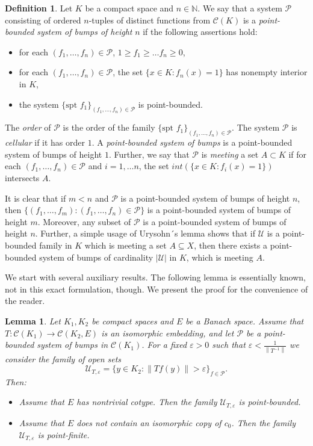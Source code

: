 \documentclass{amsart}
\numberwithin{equation}{section}
\newtheorem{lemma}[thm]{Lemma}
\theoremstyle{definition}
\newtheorem{definition}[thm]{Definition}
\def\C{\mathcal C}
\def\ep{\varepsilon}
\def\en{\mathbb N}
\newcommand{\norm}[1]{\left\|#1\right\|}
\newcommand{\abs}[1]{\left| #1  \right|}
\begin{document}
\begin{definition}
Let $K$ be a compact space and $n \in \en$. We say that a system $\mathcal{P}$ consisting of ordered $n$-tuples of distinct functions from $\C(K)$ is a \emph{point-bounded system of bumps of height} $n$ if  the following assertions hold:
\begin{itemize}
    \item for each $(f_1, \ldots, f_{n})  \in \mathcal{P}$, $1 \geq f_1 \geq \ldots f_{n} \geq 0$, 
    \item for each $(f_1, \ldots, f_{n})  \in \mathcal{P}$, the set $\{ x \in K: f_n(x)=1 \}$ has nonempty interior in $K$,
    \item the system $\{\text{spt } f_1\}_{(f_1, \ldots, f_n) \in \mathcal{P}}$ is point-bounded.
\end{itemize}
The \emph{order} of $\mathcal{P}$ is the order of the family $\{\text{spt } f_1\}_{(f_1, \ldots, f_n) \in \mathcal{P}}$. The system $\mathcal{P}$ is \emph{cellular} if it has order $1$.
A \emph{point-bounded system of bumps} is a point-bounded system of bumps of height $1$.
Further, we say that $\mathcal{P}$ is \emph{meeting} a set $A \subset K$ if for each $(f_1, \ldots, f_{n}) \in \mathcal{P}$ and $i=1, \ldots n$, the set $int(\{ x \in K: f_i(x)=1 \})$ intersects $A$. 
\end{definition}

It is clear that if $m<n$ and $\mathcal{P}$ is a point-bounded system of bumps of height $n$, then $\{(f_1, \ldots ,f_m): (f_1, \ldots ,f_n) \in \mathcal{P} \}$ is a point-bounded system of bumps of height $m$. Moreover, any subset of $\mathcal{P}$ is a point-bounded system of bumps of height $n$. Further, a simple usage of Urysohn´s lemma shows that if $\mathcal{U}$ is a point-bounded family in $K$ which is meeting a set $A \subseteq X$, then there exists a point-bounded system of bumps of cardinality $\abs{\mathcal{U}}$ in $K$, which is meeting $A$.

We start with several auxiliary results. The following lemma is essentially known, not in this exact formulation, though. We present the proof for the convenience of the reader.

\begin{lemma}
\label{point finite}
Let $K_1, K_2$ be compact spaces and $E$ be a Banach space. Assume that $T: \C(K_1) \rightarrow \C(K_2, E)$ is an isomorphic embedding, and let $\mathcal{P}$ be a point-bounded system of bumps in $\C(K_1)$. For a fixed $\ep>0$ such that $\ep<\frac{1}{\norm{T^{-1}}}$ we consider the family of open sets
\[\mathcal{U}_{T, \ep}=\{y \in K_2: \norm{Tf(y)} > \ep\}_{f \in \mathcal{P}}.\]
Then:
\begin{itemize}
    \item[(i)] Assume that $E$ has nontrivial cotype. Then the family $\mathcal{U}_{T, \ep}$ is point-bounded. 
    \item[(ii)] Assume that $E$ does not contain an isomorphic copy of $c_0$. Then the family $\mathcal{U}_{T, \ep}$ is point-finite.
\end{itemize}
\end{lemma}
\end{document}
